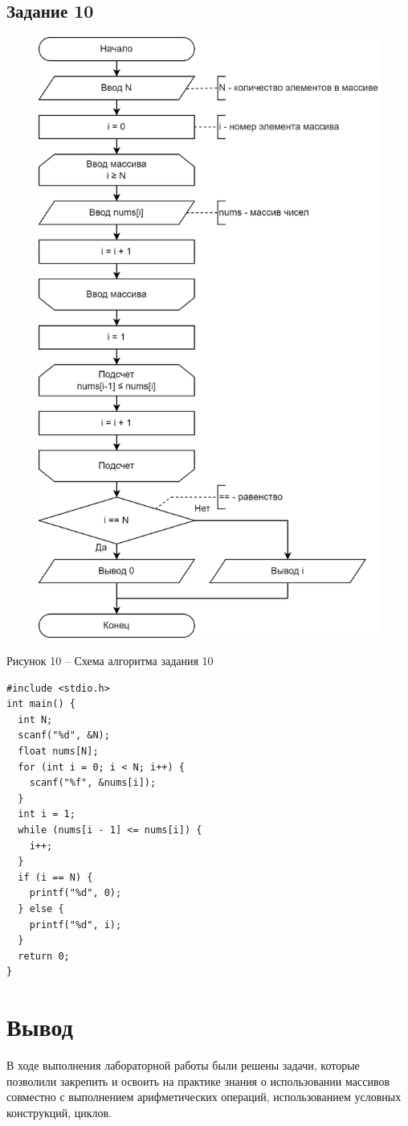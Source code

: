 \documentclass[a4paper,14pt]{extarticle}
\begin{document}
  \subsection*{Задание 10}
  \begin{figure}[h]
    \centering
    \includegraphics[width=0.6\linewidth]{schemes/s-10}
  \end{figure}
  \begin{center}
    Рисунок 10 – Схема алгоритма задания 10
  \end{center}
  \begin{lstlisting}[tabsize=2,basicstyle=\ttfamily]
#include <stdio.h>
int main() {
  int N;
  scanf("%d", &N);
  float nums[N];
  for (int i = 0; i < N; i++) {
    scanf("%f", &nums[i]);
  }
  int i = 1;
  while (nums[i - 1] <= nums[i]) {
    i++;
  }
  if (i == N) {
    printf("%d", 0);
  } else {
    printf("%d", i);
  }
  return 0;
}
  \end{lstlisting}

  \section*{Вывод}
  В ходе выполнения лабораторной работы были решены задачи, которые позволили закрепить и освоить на практике знания о использовании массивов совместно с выполнением арифметических операций, использованием условных конструкций, циклов.
\end{document}
